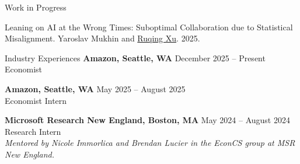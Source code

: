 \documentclass{resume} %
\begin{document}
\begin{rSection}{Work in Progress}

Leaning on AI at the Wrong Times: Suboptimal Collaboration due to Statistical Misalignment. Yaroslav Mukhin and \underline{Ruqing Xu}. 2025.

\end{rSection}

\begin{rSection}{Industry Experiences}
  {\bf Amazon, Seattle, WA} \hfill {December 2025 -- Present} \\
  Economist \vspace{-0.5em}

  {\bf Amazon, Seattle, WA} \hfill {May 2025 -- August 2025} \\
  Economist Intern \vspace{-0.5em}

  {\bf Microsoft Research New England, Boston, MA} \hfill {May 2024 -- August 2024} \\
  Research Intern \\
  \emph{Mentored by Nicole Immorlica and Brendan Lucier in the EconCS group at MSR New England.}
  
\end{rSection}



\end{document}
